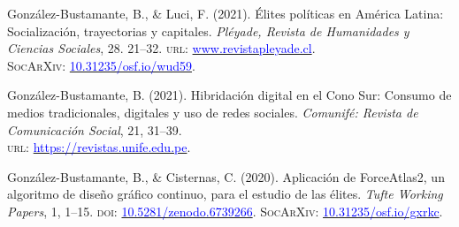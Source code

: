 \begin{publications}
\begin{benumerate}{14}
\item{\small González-Bustamante, B., \& Luci, F. (2021). Élites políticas en América Latina: Socialización, trayectorias y capitales. {\itshape Pléyade, Revista de Humanidades y Ciencias Sociales}, 28. 21--32. {\scshape url:} \href{http://www.revistapleyade.cl/index.php/OJS/article/view/359}{\textcolor{blue}{www.revistapleyade.cl}}. \\ {\scshape \footnotesize SocArXiv:} \href{https://doi.org/10.31235/osf.io/wud59}{\textcolor{blue}{10.31235/osf.io/wud59}}.}\vspace{1mm}


\item{\small González-Bustamante, B. (2021).  Hibridación digital en el Cono Sur: Consumo de medios tradicionales, digitales y uso de redes sociales. {\itshape Comunifé: Revista de Comunicación Social}, 21, 31--39. \\ {\scshape url:} \href{https://revistas.unife.edu.pe/index.php/comunife/article/view/2580/}{\textcolor{blue}{https://revistas.unife.edu.pe}}.}\vspace{1mm}


\item{\small González-Bustamante, B., \& Cisternas, C. (2020). Aplicación de ForceAtlas2, un algoritmo de diseño gráfico continuo, para el estudio de las élites. {\itshape Tufte Working Papers}, 1, 1--15. {\scshape doi:} \href{https://doi.org/10.5281/zenodo.6739266}{\textcolor{blue}{10.5281/zenodo.6739266}}. {\scshape \footnotesize SocArXiv:} \href{https://doi.org/10.31235/osf.io/gxrkc}{\textcolor{blue}{10.31235/osf.io/gxrkc}}.}\vspace{1mm}


\end{benumerate}
\end{publications}
